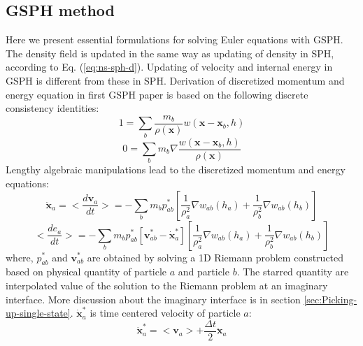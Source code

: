 \subsection{GSPH method} \label{sec:GSPH-method}
Here we present essential formulations for solving Euler equations with GSPH. The density field is updated in the same way as updating of density in SPH, according to Eq. (\ref{eq:ns-sph-d}). Updating of velocity and internal energy in GSPH is different from these in SPH. 
Derivation of discretized momentum and energy equation in first GSPH paper \citep{inutsuka2002reformulation} is based on the following discrete consistency identities: 
\begin{equation}
1=\sum_{b} \frac{m_{b}}{\rho(\textbf{x})}w(\textbf{x} - \textbf{x}_{b}, h)
\label{eq:GSPH-basic1}
\end{equation}
\begin{equation}
0=\sum_{b} m_{b} \nabla \frac{w(\textbf{x} - \textbf{x}_{b}, h)}{\rho(\textbf{x})}
\label{eq:GSPH-basic2}
\end{equation}
Lengthy algebraic manipulations \citep{inutsuka2002reformulation,iwasaki2011smoothed} lead to the discretized momentum and energy equations:
\begin{equation}
\ddot{\textbf{x}}_{a} = <\dfrac{d \textbf{v}_{a}}{dt}>= -\sum_{b} m_{b} p_{a b}^{\ast} \left[\frac{1}{\rho_{a}^2} \nabla w_{a b}(h_{a}) + \frac{1}{\rho_{b}^2} \nabla w_{a b}(h_{b}) \right]
\label{eq:gov-gsph-v-simple-form}
\end{equation}
\begin{equation}
<\dfrac{d e_{a}}{dt}>= - \sum_{b} m_{b} p_{a b}^{\ast} [\textbf{v}_{a b}^{\ast} - \dot{\textbf{x}}_{a}^{\ast}] \left[\frac{1}{\rho_{a}^2} \nabla w_{a b}(h_{a}) + \frac{1}{\rho_{b}^2} \nabla w_{a b}(h_{b}) \right]
\label{eq:gov-gsph-e-simple-form}
\end{equation}
where, $p_{a b}^{\ast}$ and $\textbf{v}_{a b}^{\ast}$ are obtained by solving a 1D Riemann problem constructed based on physical quantity of particle $a$ and particle $b$. The starred quantity are interpolated value of the solution to the Riemann problem at an imaginary interface. More discussion about the imaginary interface is in section \ref{sec:Picking-up-single-state}.
$\dot{\textbf{x}}_{a}^{\ast}$ is time centered velocity of particle $a$:
\begin{equation}
\dot{\textbf{x}}_{a}^{\ast} = <\textbf{v}_{a}> + \frac{\Delta t}{2} \ddot{\textbf{x}}_{a}
\end{equation}


